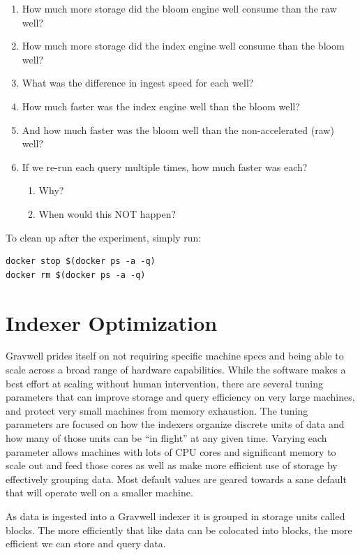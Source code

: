 \begin{enumerate}
\item How much more storage did the bloom engine well consume than the raw well?
\item How much more storage did the index engine well consume than the bloom well?
\item What was the difference in ingest speed for each well?
\item How much faster was the index engine well than the bloom well?
\item And how much faster was the bloom well than the non-accelerated (raw) well?
\item If we re-run each query multiple times, how much faster was each?
	\begin{enumerate}
	\item Why?
	\item When would this NOT happen?
	\end{enumerate}
\end{enumerate}

To clean up after the experiment, simply run:

\begin{Verbatim}[breaklines=true]
docker stop $(docker ps -a -q)
docker rm $(docker ps -a -q)
\end{Verbatim}

\section{Indexer Optimization}
Gravwell prides itself on not requiring specific machine specs and
being able to scale across a broad range of hardware capabilities.
While the software makes a best effort at scaling without human
intervention, there are several tuning parameters that can improve
storage and query efficiency on very large machines, and protect very
small machines from memory exhaustion. The tuning parameters are
focused on how the indexers organize discrete units of data and how
many of those units can be ``in flight'' at any given time. Varying
each parameter allows machines with lots of CPU cores and significant
memory to scale out and feed those cores as well as make more efficient
use of storage by effectively grouping data. Most default values are
geared towards a sane default that will operate well on a smaller
machine.

As data is ingested into a Gravwell indexer it is grouped in storage
units called blocks. The more efficiently that like data can be
colocated into blocks, the more efficient we can store and query data.

